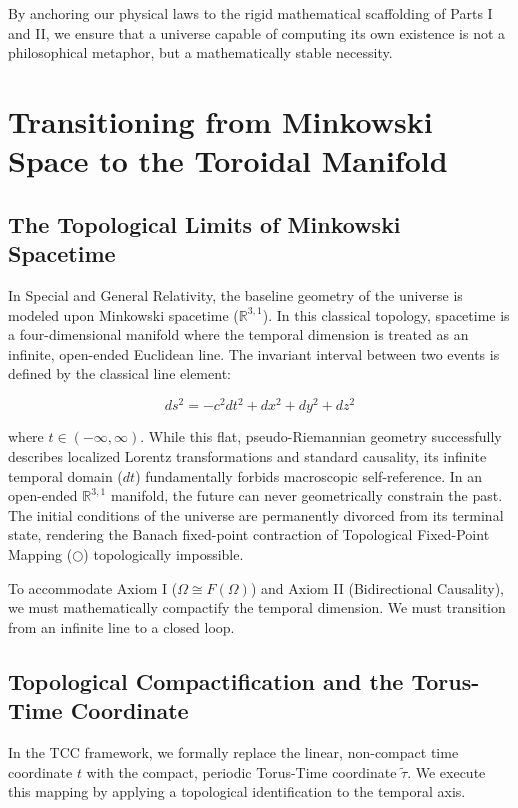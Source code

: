 \documentclass[12pt,openany]{book}
\theoremstyle{plain}
\theoremstyle{definition}
\theoremstyle{remark}
\begin{document}
By anchoring our physical laws to the rigid mathematical scaffolding of Parts I and II, we ensure that a universe capable of computing its own existence is not a philosophical metaphor, but a mathematically stable necessity.




\chapter{Transitioning from Minkowski Space to the Toroidal Manifold}

\section{The Topological Limits of Minkowski Spacetime}

In Special and General Relativity, the baseline geometry of the universe is modeled upon Minkowski spacetime ($\mathbb{R}^{3,1}$). In this classical topology, spacetime is a four-dimensional manifold where the temporal dimension is treated as an infinite, open-ended Euclidean line. The invariant interval between two events is defined by the classical line element:

\begin{equation}
ds^2 = -c^2dt^2 + dx^2 + dy^2 + dz^2
\end{equation}

where $t \in (-\infty, \infty)$. While this flat, pseudo-Riemannian geometry successfully describes localized Lorentz transformations and standard causality, its infinite temporal domain ($dt$) fundamentally forbids macroscopic self-reference. In an open-ended $\mathbb{R}^{3,1}$ manifold, the future can never geometrically constrain the past. The initial conditions of the universe are permanently divorced from its terminal state, rendering the Banach fixed-point contraction of Topological Fixed-Point Mapping ($\bigcirc$) topologically impossible.

To accommodate Axiom I ($\Omega \cong F(\Omega)$) and Axiom II (Bidirectional Causality), we must mathematically compactify the temporal dimension. We must transition from an infinite line to a closed loop.

\section{Topological Compactification and the Torus-Time Coordinate}

In the TCC framework, we formally replace the linear, non-compact time coordinate $t$ with the compact, periodic Torus-Time coordinate $\tilde{\tau}$. We execute this mapping by applying a topological identification to the temporal axis. 
\end{document}
